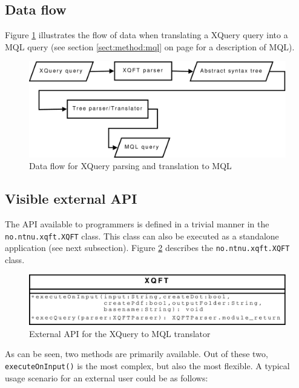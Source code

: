 \subsection{Data flow}
Figure \ref{fig:impl:sys:mql_dataflow} illustrates the flow of data when
translating a XQuery query into a MQL query (see section \ref{sect:method:mql}
on page \pageref{sect:method:mql} for a description of MQL). 

\begin{figure}[!htp]
\begin{center}
  \includegraphics[scale=0.5]{diagrams/mql_dataflow}
  \caption{Data flow for XQuery parsing and translation to MQL}
  \label{fig:impl:sys:mql_dataflow}
\end{center}
\end{figure}

\subsection{Visible external API}
The API available to programmers is defined in a trivial manner in the
\texttt{no.ntnu.xqft.XQFT} class. This class can also be executed as a
standalone application (see next subsection). Figure
\ref{fig:impl:sys:xqft_extapi_uml} describes the \texttt{no.ntnu.xqft.XQFT}
class.

\begin{figure}[!htp]
\begin{center}
  \includegraphics[scale=0.5]{diagrams/xqft_extapi_uml}
  \caption{External API for the XQuery to MQL translator}
  \label{fig:impl:sys:xqft_extapi_uml}
\end{center}
\end{figure}

As can be seen, two methods are primarily available. Out of these two,
\texttt{executeOnInput()} is the most complex, but also the most flexible. A
typical usage scenario for an external user could be as follows:

